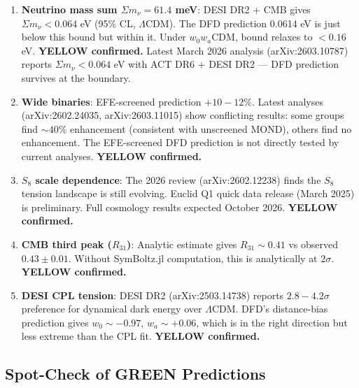 \documentclass[11pt,a4paper]{article}
\begin{document}
\begin{enumerate}
\item \textbf{Neutrino mass sum $\Sigma m_\nu = 61.4$ meV}: DESI DR2 + CMB gives $\Sigma m_\nu < 0.064$ eV (95\% CL, $\Lambda$CDM). The DFD prediction 0.0614 eV is just below this bound but within it. Under $w_0w_a$CDM, bound relaxes to $< 0.16$ eV. \textbf{YELLOW confirmed.} Latest March 2026 analysis (arXiv:2603.10787) reports $\Sigma m_\nu < 0.064$ eV with ACT DR6 + DESI DR2 --- DFD prediction survives at the boundary.

\item \textbf{Wide binaries}: EFE-screened prediction $+10-12\%$. Latest analyses (arXiv:2602.24035, arXiv:2603.11015) show conflicting results: some groups find $\sim 40\%$ enhancement (consistent with unscreened MOND), others find no enhancement. The EFE-screened DFD prediction is not directly tested by current analyses. \textbf{YELLOW confirmed.}

\item \textbf{$S_8$ scale dependence}: The 2026 review (arXiv:2602.12238) finds the $S_8$ tension landscape is still evolving. Euclid Q1 quick data release (March 2025) is preliminary. Full cosmology results expected October 2026. \textbf{YELLOW confirmed.}

\item \textbf{CMB third peak ($R_{31}$)}: Analytic estimate gives $R_{31} \sim 0.41$ vs observed $0.43 \pm 0.01$. Without SymBoltz.jl computation, this is analytically at $2\sigma$. \textbf{YELLOW confirmed.}

\item \textbf{DESI CPL tension}: DESI DR2 (arXiv:2503.14738) reports $2.8-4.2\sigma$ preference for dynamical dark energy over $\Lambda$CDM. DFD's distance-bias prediction gives $w_0 \sim -0.97$, $w_a \sim +0.06$, which is in the right direction but less extreme than the CPL fit. \textbf{YELLOW confirmed.}
\end{enumerate}

\subsection{Spot-Check of GREEN Predictions}
\end{document}
